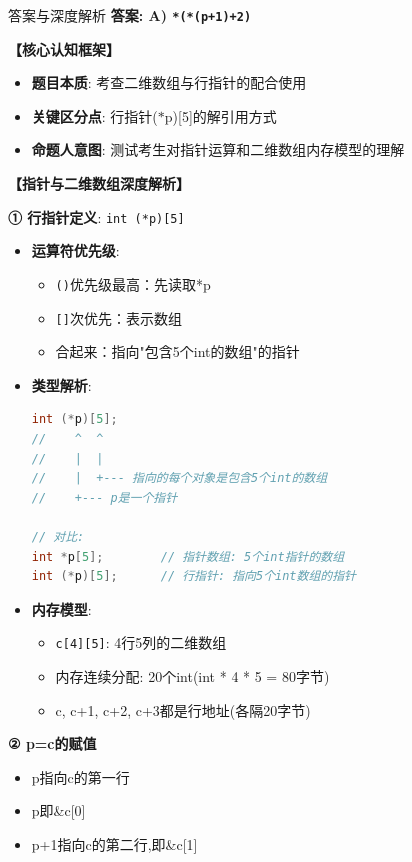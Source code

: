 \documentclass[a4paper,12pt]{article}
\begin{document}
\begin{bluebox}{答案与深度解析}
	\textbf{答案: A) \texttt{*(*(p+1)+2)}}

	\textbf{【核心认知框架】}
	\begin{itemize}[leftmargin=*, nosep]
		\item \textbf{题目本质}: 考查二维数组与行指针的配合使用
		\item \textbf{关键区分点}: 行指针($*$p)[5]的解引用方式
		\item \textbf{命题人意图}: 测试考生对指针运算和二维数组内存模型的理解
	\end{itemize}

	\textbf{【指针与二维数组深度解析】}

	\textbf{① 行指针定义}: \texttt{int (*p)[5]}
	\begin{itemize}[leftmargin=*, nosep]
		\item \textbf{运算符优先级}:
		      \begin{itemize}
			      \item \texttt{()}优先级最高：先读取*p
			      \item \texttt{[]}次优先：表示数组
			      \item 合起来：指向"包含5个int的数组"的指针
		      \end{itemize}

		\item \textbf{类型解析}:
		      \begin{lstlisting}[language=C]
int (*p)[5];
//    ^  ^
//    |  |
//    |  +--- 指向的每个对象是包含5个int的数组
//    +--- p是一个指针

// 对比:
int *p[5];        // 指针数组: 5个int指针的数组
int (*p)[5];      // 行指针: 指向5个int数组的指针
    \end{lstlisting}

		\item \textbf{内存模型}:
		      \begin{itemize}
			      \item \texttt{c[4][5]}: 4行5列的二维数组
			      \item 内存连续分配: 20个int(int * 4 * 5 = 80字节)
			      \item c, c+1, c+2, c+3都是行地址(各隔20字节)
		      \end{itemize}
	\end{itemize}

	\textbf{② p=c的赋值}
	\begin{itemize}[leftmargin=*, nosep]
		\item p指向c的第一行
		\item p即\&c[0]
		\item p+1指向c的第二行,即\&c[1]
	\end{itemize}


\end{bluebox}
\end{document}
